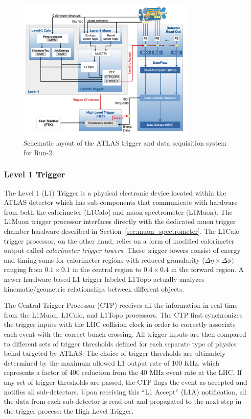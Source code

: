 \begin{figure}
	\centering
	\includegraphics[width=0.8\textwidth]{atlas_trigger_system}
	\caption{Schematic layout of the ATLAS trigger and data scquisition system for Run-2. \cite{Ruiz-Martinez:2133909}}
	\label{fig:trigger_system}
\end{figure}

\subsubsection{Level 1 Trigger}
The Level 1 (L1) Trigger is a physical electronic device located within the ATLAS detector which has sub-components that communicate with hardware from both the calorimeter (L1Calo) and muon spectrometer (L1Muon).
The L1Muon trigger processor interfaces directly with the dedicated muon trigger chamber hardware described in Section~\ref{sec:muon_spectrometer}.
The L1Calo trigger processor, on the other hand, relies on a form of modified calorimeter output called \textit{calorimeter trigger towers}.
These trigger towers consist of energy and timing sums for calorimeter regions with reduced granularity ($\Delta \eta \times \Delta \phi)$ ranging from $0.1 \times 0.1$ in the central region to $0.4 \times 0.4$ in the forward region.
A newer hardware-based L1 trigger labeled L1Topo actually analyzes kinematic/geometric relationships between different objects.

The Central Trigger Processor (CTP) receives all the information in real-time from the L1Muon, L1Calo, and L1Topo processors.
The CTP first synchronizes the trigger inputs with the LHC collision clock in order to correctly associate each event with the correct bunch crossing.
All trigger inputs are then compared to different sets of trigger thresholds defined for each separate type of physics beind targeted by ATLAS.
The choice of trigger thresholds are ultimately determined by the maximum allowed L1 output rate of 100 KHz, which represents a factor of 400 reduction from the 40 MHz event rate at the LHC.
If any set of trigger thresholds are passed, the CTP flags the event as accepted and notifies all sub-detectors.
Upon receiving this ``L1 Accept'' (L1A) notification, all the data from each sub-detector is read out and propagated to the next step in the trigger process: the High Level Trigger.


